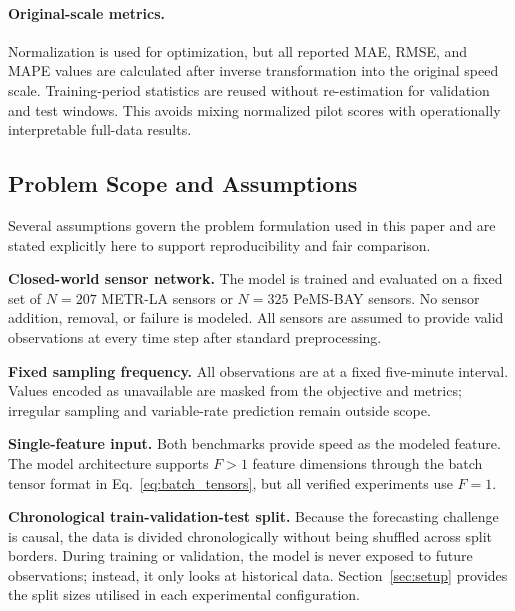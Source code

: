 \documentclass[fleqn,10pt]{wlscirep}
\newcommand{\chg}[1]{{\color{changeblue}#1}}
\newenvironment{changedcontent}{\color{changeblue}}{}
\begin{document}
\paragraph{Original-scale metrics.}
\begin{changedcontent}
Normalization is used for optimization, but all reported MAE, RMSE, and MAPE
values are calculated after inverse transformation into the original speed
scale. Training-period statistics are reused without re-estimation for
validation and test windows. This avoids mixing normalized pilot scores with
operationally interpretable full-data results.
\end{changedcontent}

\subsection{Problem Scope and Assumptions}

Several assumptions govern the problem formulation used in this
paper and are stated explicitly here to support reproducibility
and fair comparison.

\textbf{Closed-world sensor network.} The model is trained and
evaluated on a fixed set of \chg{$N=207$ METR-LA sensors or $N=325$
PeMS-BAY sensors}. No sensor addition,
removal, or failure is modeled. All sensors are assumed to provide
valid observations at every time step after standard preprocessing.

\textbf{Fixed sampling frequency.} All observations are at a
fixed five-minute interval. \chg{Values encoded as unavailable are masked
from the objective and metrics; irregular sampling and variable-rate
prediction remain outside scope.}

\textbf{Single-feature input.} \chg{Both benchmarks provide speed as the
modeled feature.} The model architecture supports $F > 1$ feature
dimensions through the batch tensor format in
Eq.~\eqref{eq:batch_tensors}, but all verified experiments use
$F = 1$.

\textbf{Chronological train-validation-test split.} Because the forecasting challenge is causal, the data is divided chronologically without being shuffled across split borders. During training or validation, the model is never exposed to future observations; instead, it only looks at historical data. Section~\ref{sec:setup} provides the split sizes utilised in each experimental configuration.
\end{document}
